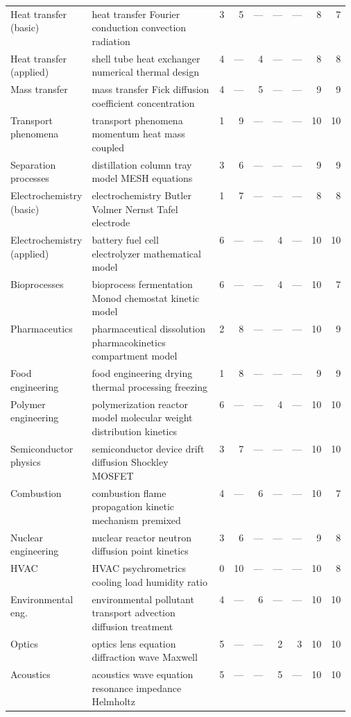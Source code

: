 \begin{footnotesize}
\begin{longtable}{@{}>{\raggedright\arraybackslash}p{0.17\linewidth}>{\raggedright\arraybackslash}p{0.40\linewidth}rrrrrrr@{}}
Heat transfer (basic) & heat transfer Fourier conduction convection radiation & 3 & 5 & --- & --- & --- & 8 & 7 \\
Heat transfer (applied) & shell tube heat exchanger numerical thermal design & 4 & --- & 4 & --- & --- & 8 & 8 \\
Mass transfer & mass transfer Fick diffusion coefficient concentration & 4 & --- & 5 & --- & --- & 9 & 9 \\
Transport phenomena & transport phenomena momentum heat mass coupled & 1 & 9 & --- & --- & --- & 10 & 10 \\
Separation processes & distillation column tray model MESH equations & 3 & 6 & --- & --- & --- & 9 & 9 \\
Electrochemistry (basic) & electrochemistry Butler Volmer Nernst Tafel electrode & 1 & 7 & --- & --- & --- & 8 & 8 \\
Electrochemistry (applied) & battery fuel cell electrolyzer mathematical model & 6 & --- & --- & 4 & --- & 10 & 10 \\
Bioprocesses & bioprocess fermentation Monod chemostat kinetic model & 6 & --- & --- & 4 & --- & 10 & 7 \\
Pharmaceutics & pharmaceutical dissolution pharmacokinetics compartment model & 2 & 8 & --- & --- & --- & 10 & 9 \\
Food engineering & food engineering drying thermal processing freezing & 1 & 8 & --- & --- & --- & 9 & 9 \\
Polymer engineering & polymerization reactor model molecular weight distribution kinetics & 6 & --- & --- & 4 & --- & 10 & 10 \\
Semiconductor physics & semiconductor device drift diffusion Shockley MOSFET & 3 & 7 & --- & --- & --- & 10 & 10 \\
Combustion & combustion flame propagation kinetic mechanism premixed & 4 & --- & 6 & --- & --- & 10 & 7 \\
Nuclear engineering & nuclear reactor neutron diffusion point kinetics & 3 & 6 & --- & --- & --- & 9 & 8 \\
HVAC & HVAC psychrometrics cooling load humidity ratio & 0 & 10 & --- & --- & --- & 10 & 8 \\
Environmental eng. & environmental pollutant transport advection diffusion treatment & 4 & --- & 6 & --- & --- & 10 & 10 \\
Optics & optics lens equation diffraction wave Maxwell & 5 & --- & --- & 2 & 3 & 10 & 10 \\
Acoustics & acoustics wave equation resonance impedance Helmholtz & 5 & --- & --- & 5 & --- & 10 & 10 \\

\end{longtable}
\end{footnotesize}
